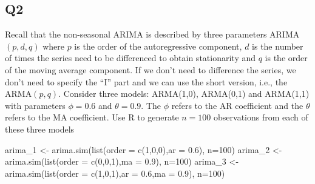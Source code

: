 \documentclass[
]{article}
\newenvironment{Shaded}{\begin{snugshade}}{\end{snugshade}}
\newcommand{\AttributeTok}[1]{\textcolor[rgb]{0.77,0.63,0.00}{#1}}
\newcommand{\DecValTok}[1]{\textcolor[rgb]{0.00,0.00,0.81}{#1}}
\newcommand{\FloatTok}[1]{\textcolor[rgb]{0.00,0.00,0.81}{#1}}
\newcommand{\FunctionTok}[1]{\textcolor[rgb]{0.00,0.00,0.00}{#1}}
\newcommand{\NormalTok}[1]{#1}
\newcommand{\OtherTok}[1]{\textcolor[rgb]{0.56,0.35,0.01}{#1}}
\begin{document}
\hypertarget{q2}{%
\subsection{Q2}\label{q2}}

Recall that the non-seasonal ARIMA is described by three parameters
ARIMA\((p,d,q)\) where \(p\) is the order of the autoregressive
component, \(d\) is the number of times the series need to be
differenced to obtain stationarity and \(q\) is the order of the moving
average component. If we don't need to difference the series, we don't
need to specify the ``I'' part and we can use the short version, i.e.,
the ARMA\((p,q)\). Consider three models: ARMA(1,0), ARMA(0,1) and
ARMA(1,1) with parameters \(\phi=0.6\) and \(\theta= 0.9\). The \(\phi\)
refers to the AR coefficient and the \(\theta\) refers to the MA
coefficient. Use R to generate \(n=100\) observations from each of these
three models

\begin{Shaded}
\begin{Highlighting}[]
\NormalTok{arima\_1 }\OtherTok{\textless{}{-}} \FunctionTok{arima.sim}\NormalTok{(}\FunctionTok{list}\NormalTok{(}\AttributeTok{order =} \FunctionTok{c}\NormalTok{(}\DecValTok{1}\NormalTok{,}\DecValTok{0}\NormalTok{,}\DecValTok{0}\NormalTok{),}\AttributeTok{ar =} \FloatTok{0.6}\NormalTok{), }\AttributeTok{n=}\DecValTok{100}\NormalTok{)}
\NormalTok{arima\_2 }\OtherTok{\textless{}{-}} \FunctionTok{arima.sim}\NormalTok{(}\FunctionTok{list}\NormalTok{(}\AttributeTok{order =} \FunctionTok{c}\NormalTok{(}\DecValTok{0}\NormalTok{,}\DecValTok{0}\NormalTok{,}\DecValTok{1}\NormalTok{),}\AttributeTok{ma =} \FloatTok{0.9}\NormalTok{), }\AttributeTok{n=}\DecValTok{100}\NormalTok{)}
\NormalTok{arima\_3 }\OtherTok{\textless{}{-}} \FunctionTok{arima.sim}\NormalTok{(}\FunctionTok{list}\NormalTok{(}\AttributeTok{order =} \FunctionTok{c}\NormalTok{(}\DecValTok{1}\NormalTok{,}\DecValTok{0}\NormalTok{,}\DecValTok{1}\NormalTok{),}\AttributeTok{ar =} \FloatTok{0.6}\NormalTok{,}\AttributeTok{ma =} \FloatTok{0.9}\NormalTok{), }\AttributeTok{n=}\DecValTok{100}\NormalTok{)}
\end{Highlighting}
\end{Shaded}
\end{document}
